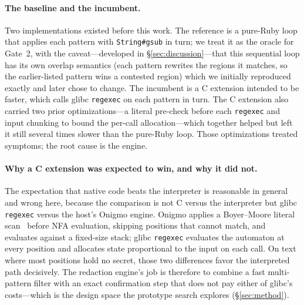 \documentclass[acmsmall,nonacm,screen]{acmart}
\begin{document}
\paragraph{The baseline and the incumbent.} Two implementations existed before this
work. The reference is a pure-Ruby loop that applies each pattern with
\texttt{String\#gsub} in turn; we treat it as the oracle for Gate~2, with the
caveat---developed in \S\ref{sec:discussion}---that this sequential loop has its own
overlap semantics (each pattern rewrites the regions it matches, so the
earlier-listed pattern wins a contested region) which we initially reproduced
exactly and later chose to change. The incumbent is a C extension intended to be
faster, which calls glibc \texttt{regexec}
on each pattern in turn. The C extension also carried two prior optimizations---a
literal pre-check before each \texttt{regexec} and input chunking to bound the
per-call allocation---which together helped but left it still several times slower
than the pure-Ruby loop. Those optimizations treated symptoms; the root cause is the
engine.

\paragraph{Why a C extension was expected to win, and why it did not.} The
expectation that native code beats the interpreter is reasonable in general and
wrong here, because the comparison is not C versus the interpreter but glibc
\texttt{regexec} versus the host's Onigmo engine. Onigmo applies a Boyer--Moore
literal scan~\cite{boyer1977fast} before NFA evaluation, skipping positions that
cannot match, and evaluates against a fixed-size stack; glibc \texttt{regexec}
evaluates the automaton at every position and allocates state proportional to the
input on each call. On text where most positions hold no secret, those two
differences favor the interpreted path decisively. The redaction engine's job is
therefore to combine a fast multi-pattern filter with an exact confirmation step
that does not pay either of glibc's costs---which is the design space the prototype
search explores (\S\ref{sec:method}).
\end{document}
